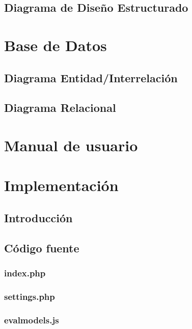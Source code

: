 \documentclass[12pt,a4paper,spanish,twoside]{article}
\begin{document}
\subsection{Diagrama de Diseño Estructurado}

\section{Base de Datos}
\subsection{Diagrama Entidad/Interrelación}
\subsection{Diagrama Relacional}

\section{Manual de usuario}

\section{Implementación}
\subsection{Introducción}
\subsection{Código fuente}
\subsubsection{index.php}

\subsubsection{settings.php}

\subsubsection{evalmodels.js}

\end{document}
